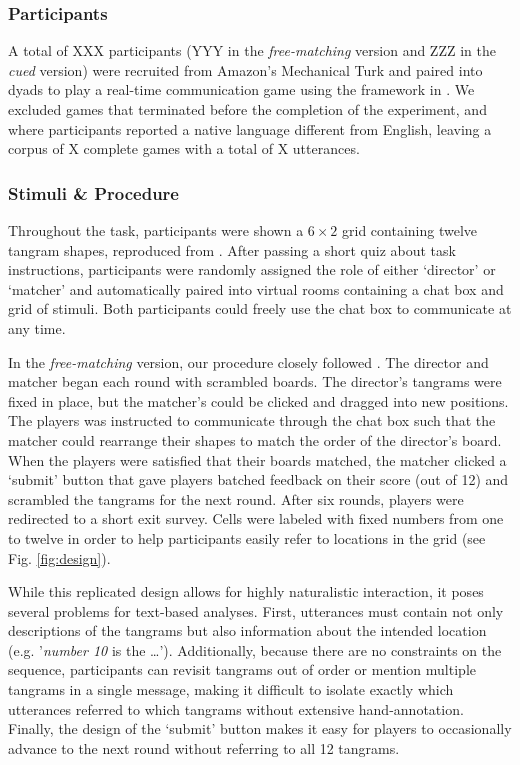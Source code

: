 \documentclass[alpha-refs]{wiley-article}
\begin{document}
\subsubsection{Participants}\label{participants}

A total of XXX participants (YYY in the \emph{free-matching} version and ZZZ in the \emph{cued} version) were recruited from Amazon's Mechanical Turk and paired into dyads to play a real-time communication game using the framework in \cite{Hawkins15_RealTimeWebExperiments}. 
We excluded games that terminated before the completion of the experiment, and where participants reported a native language different from English, leaving a corpus of X complete games with a total of X utterances.

\subsubsection{Stimuli \& Procedure}\label{stimuli}

Throughout the task, participants were shown a \(6 \times 2\) grid containing twelve tangram shapes, reproduced from \cite{clarkReferringCollaborativeProcess1986}.  
After passing a short quiz about task instructions, participants were randomly assigned the role of either `director' or `matcher' and automatically paired into virtual rooms containing a chat box and grid of stimuli. 
Both participants could freely use the chat box to communicate at any time. 

In the \emph{free-matching} version, our procedure closely followed \cite{clarkReferringCollaborativeProcess1986}. 
The director and matcher began each round with scrambled boards. 
The director's tangrams were fixed in place, but the matcher's could be clicked and dragged into new positions.
The players was instructed to communicate through the chat box such that the matcher could  rearrange their shapes to match the order of the director's board.
When the players were satisfied that their boards matched, the matcher clicked a `submit' button that gave players batched feedback on their score (out of 12) and scrambled the tangrams for the next round. 
After six rounds, players were redirected to a short exit survey. 
Cells were labeled with fixed numbers from one to twelve in order to help participants easily refer to locations in the grid (see Fig. \ref{fig:design}).

While this replicated design allows for highly naturalistic interaction, it poses several problems for text-based analyses. First, utterances must contain not only descriptions of the tangrams but also information about the intended location (e.g. '\emph{number 10} is the \dots'). Additionally, because there are no constraints on the sequence, participants can revisit tangrams out of order or mention multiple tangrams in a single message, making it difficult to isolate exactly which utterances referred to which tangrams without extensive hand-annotation. Finally, the design of the `submit' button makes it easy for players to occasionally advance to the next round without referring to all 12 tangrams. 
\end{document}
